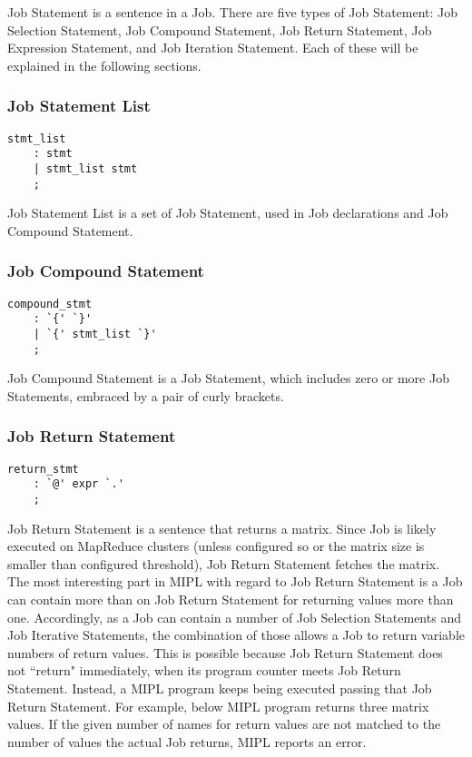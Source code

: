 \documentclass[prodmode,acmtecs]{acmsmall}
\begin{document}
Job Statement is a sentence in a Job.  There are five types of
Job Statement: Job Selection Statement, Job Compound Statement,
Job Return Statement, Job Expression Statement, and Job Iteration
Statement.  Each of these will be explained in the following
sections.

\subsubsection{Job Statement List}

\begin{lstlisting}
stmt_list
	: stmt
	| stmt_list stmt
	;
\end{lstlisting}

Job Statement List is a set of Job Statement, used in Job
declarations and Job Compound Statement.


\subsubsection{Job Compound Statement}

\begin{lstlisting}
compound_stmt
	: `{' `}'
	| `{' stmt_list `}'
	;
\end{lstlisting}

Job Compound Statement is a Job Statement, which includes
zero or more Job Statements, embraced by a pair of curly
brackets.

\subsubsection{Job Return Statement}

\begin{lstlisting}
return_stmt
	: `@' expr `.'
	;

\end{lstlisting}

Job Return Statement is a sentence that returns a matrix.  Since
Job is likely executed on MapReduce clusters (unless configured
so or the matrix size is smaller than configured threshold), Job
Return Statement fetches the matrix.  The most interesting part
in MIPL with regard to Job Return Statement is a Job can contain
more than on Job Return Statement for returning values more than
one.  Accordingly, as a Job can contain a number of Job Selection
Statements and Job Iterative Statements, the combination of those
allows a Job to return variable numbers of return values. This is
possible because Job Return Statement does not ``return" immediately,
when its program counter meets Job Return Statement.  Instead, a
MIPL program keeps being executed passing that Job Return Statement.
For example, below MIPL program returns three matrix values.  If
the given number of names for return values are not matched to the
number of values the actual Job returns, MIPL reports an error.
\end{document}
